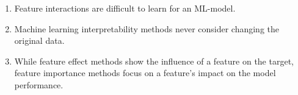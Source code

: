 \begin{enumerate}
    \item Feature interactions are difficult to learn for an ML-model.
    
    \item Machine learning interpretability methods never consider changing the original data.
    
    \item While feature effect methods show the influence of a feature on the target, feature importance methods focus on a feature's impact on the model performance.
    
\end{enumerate}